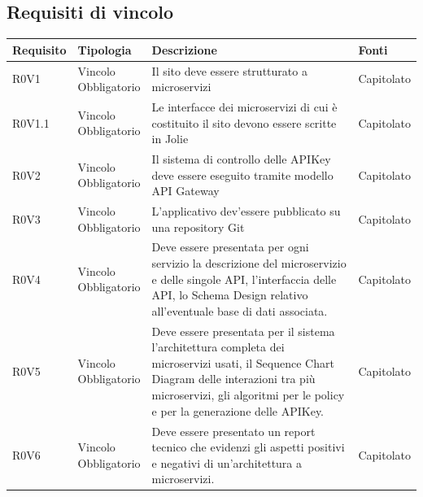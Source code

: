 \documentclass[12pt,a4paper,titlepage]{article}
\newcommand{\minitab}[2][1]{\begin{tabular}#1 #2\end{tabular}}
\begin{document}
	\subsection{Requisiti di vincolo}
	{\renewcommand\arraystretch{1.2}  %
		\small
		\begin{longtable}{|m{5em}|m{6em}|m{28em}|m{5em}|}
			\hline
			\textbf{Requisito} & \textbf{Tipologia}  & \textbf{Descrizione} & \textbf{Fonti} \\
			\hline
			R0V1 & \minitab[c]{Vincolo\\Obbligatorio} & Il sito deve essere strutturato a microservizi & Capitolato\\
			\hline
			R0V1.1 & \minitab[c]{Vincolo\\Obbligatorio} & Le interfacce dei microservizi di cui è costituito il sito devono essere scritte in Jolie & Capitolato\\
			\hline
			R0V2 & \minitab[c]{Vincolo\\Obbligatorio} & Il sistema di controllo delle APIKey deve essere eseguito tramite modello API Gateway & Capitolato\\
			\hline
			R0V3 & \minitab[c]{Vincolo\\Obbligatorio} & L'applicativo dev'essere pubblicato su una repository Git & Capitolato\\
			\hline
			R0V4 & \minitab[c]{Vincolo\\Obbligatorio} & Deve essere presentata per ogni servizio la descrizione del microservizio e delle singole API, l'interfaccia delle API, lo Schema Design relativo all'eventuale base di dati associata. & Capitolato\\
			\hline
			R0V5 & \minitab[c]{Vincolo\\Obbligatorio} & Deve essere presentata per il sistema l'architettura completa dei microservizi usati, il Sequence Chart Diagram delle interazioni tra più microservizi, gli algoritmi per le policy e per la generazione delle APIKey. & Capitolato\\
			\hline
			R0V6 & \minitab[c]{Vincolo\\Obbligatorio} & Deve essere presentato un report tecnico che evidenzi gli aspetti positivi e negativi di un'architettura a microservizi. & Capitolato\\
			\hline
		\end{longtable}
	}
\end{document}
